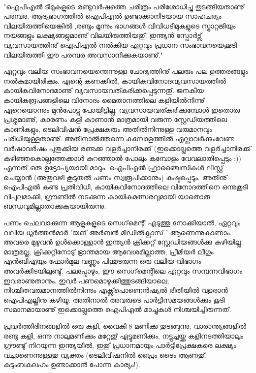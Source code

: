 ﻿
\vskip 2pt

‌\begin{framed}
"ഐപിഎല്‍ ടീമുകളുടെ രണ്ടുവര്‍ഷത്തെ ചരിത്രം പരിശോധിച്ചു തുടങ്ങിയതാണു് പരമ്പര. ആദ്യഭാഗത്തില്‍ ഐപിഎല്‍ 
ഉണ്ടാക്കാനിടയായ സാഹചര്യം വിലയിരുത്തിയെങ്കില്‍ ,രണ്ടും മൂന്നും ഭാഗങ്ങള്‍ വിവിധടീമുകളുടെ സ്ട്രാറ്റജിയും നയങ്ങളും 
ലക്ഷ്യങ്ങളുമാണു് വിലയിരുത്തിയതു്. ഇന്ത്യന്‍ സ്പോര്‍ട്സ് വ്യവസായത്തിനു് ഐപിഎല്‍ നല്‍കിയ ഏറ്റവും 
പ്രധാന സംഭാവനയെക്കൂടി വിലയിരുത്തി ഈ പരമ്പര അവസാനിക്കുകയാണു്."
\end{framed}

{\vskip 12pt}

ഏറ്റവും വലിയ സംഭാവനയെന്തെന്നുള്ള ചോദ്യത്തിനു് പലരും പല ഉത്തരങ്ങളും നല്‍കുമായിരിക്കും. എന്റെ കണക്കില്‍, 
കായികവിനോദവ്യവസായത്തില്‍ കായികവിനോദമാണു് വ്യവസായവത്കരിക്കപ്പെടുന്നതു്. ജനകീയ കായികരൂപങ്ങളിലെ 
വിനോദം മൈതാനത്തിലെ കളിയില്‍നിന്നു് ഏറെയൊന്നും മുന്‍പോട്ടു പോയിട്ടില്ല. വ്യവസായവത്കരിക്കുമ്പോള്‍ ഇതൊരു 
പ്രശ്നമാണു്, കാരണം കളി കാണാന്‍ മാത്രമായി വരുന്ന സ്റ്റേഡിയത്തിലെ കാണികളും, ടെലിവിഷന്‍ പ്രേക്ഷകരും അതില്‍നിന്നുള്ള വരുമാനവും പരിധിയുള്ളതാണു്. അതിനാല്‍ത്തന്നെ കമ്പോളത്തില്‍ എല്ലാവര്‍ക്കുംവേണ്ട വര്‍ഷാവര്‍ഷം പുതുക്കിയ രണ്ടക്ക വളര്‍ച്ചാനിരക്ക് 
(ഇക്കൊല്ലത്തെ വളര്‍ച്ചാനിരക്ക് കഴിഞ്ഞകൊല്ലത്തേക്കാള്‍ കുറഞ്ഞാല്‍ പോലും കമ്പോളം 
വേവലാതിപ്പെടും :)) എന്നത് ഒരു ഉട്ടോപ്യയായി മാറും. ഐപിഎല്‍ ഫ്രാഞ്ചൈസികള്‍ ലിസ്റ്റ് ചെയ്യാന്‍ (അതുവഴി കൂടുതല്‍ 
പണം സ്വരൂപിക്കാനും) കഷ്ടപ്പെടും. അതിനു് ഐപിഎല്‍ കണ്ട പ്രതിവിധി, കായികവിനോദത്തിലെ വിനോദത്തിനെ ഒന്നുകൂടി വിപുലമാക്കി, ഗ്രൗണ്ടില്‍ നടക്കുന്ന കായികമത്സരവുമായി യാതൊരു ബന്ധവുമില്ലാതാക്കുകയായിരുന്നു.

പണം ചെലവാക്കുന്ന ആളുകളുടെ സെഗ്‌മെന്റ് എടുത്തു നോക്കിയാല്‍, ഏറ്റവും വലിയ ധൂര്‍ത്തന്‍മാര്‍ 'യങ് അര്‍ബന്‍ 
മിഡില്‍ക്ലാസ് ' ആണെന്നുകാണാം. അവരെ മുഴുവന്‍ ഉള്‍ക്കൊള്ളാന്‍ ഇന്ത്യന്‍ ക്രിക്കറ്റ് സ്റ്റേഡിയങ്ങള്‍ക്കു കഴിയില്ല. മാത്രമല്ല, 
ക്രിക്കറ്റിനോടു് ഭ്രാന്തമായ ആവേശമില്ലാത്ത, പ്രീമിയര്‍ ലീഗും എന്‍ബിഎയും ഫോര്‍മുല വണ്ണും പിന്തുടരുന്ന ഒരു വലിയ വിഭാഗം 
അവര്‍ക്കിടയിലുണ്ടു്. പലപ്പോഴും, ഈ സെഗ്‌മെന്റിലെ ഏറ്റവും സമ്പന്നവിഭാഗം ഇവരാണുതാനും. ഇവര്‍ 
പണമൊഴുക്കിത്തുടങ്ങിയാലെ, നിശ്ചിതവരുമാനത്തില്‍നിന്നും എക്സ്‌പൊണെന്‍ഷ്യല്‍ രീതിയില്‍ വളരാന്‍ ഐപിഎല്ലിനു 
കഴിയൂ. അതിനാല്‍ അവരുടെ പാര്‍ട്ടിസമയങ്ങള്‍ക്കും കൂടി സമാനമായാണു് ഇക്കൊല്ലത്തെ ഐപിഎല്‍ മാച്ചുകള്‍ 
നിശ്ചയിച്ചിരുന്നത്.


പ്രവര്‍ത്തിദിനങ്ങളില്‍ ഒരു കളി, വൈകി 8 മണിക്കു തുടങ്ങുന്നു. വാരാന്ത്യങ്ങളില്‍ രണ്ടു കളി, ഒന്നു നാലുമണിക്കും മറ്റേതു് 
എട്ടുമണിക്കും. നട്ടുച്ചയ്ക്കു കളിനടത്തിയാലും ഗ്രൗണ്ടു് നിറയുന്ന ഇന്ത്യയില്‍, ഇതു് പ്രധാനമായും പാര്‍ട്ടിപ്രേക്ഷകരെ ലക്ഷ്യം 
വച്ചാണെന്നുള്ളതു വ്യക്തം (ടെലിവിഷനില്‍ പ്രൈം ടൈം ആണതു്, കുടുംബകലഹം ഉണ്ടാക്കാന്‍ പോന്ന കാര്യം!).

